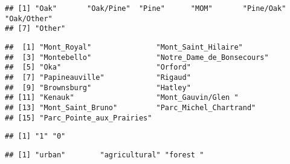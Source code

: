 \documentclass[
]{article}
\newenvironment{Shaded}{\begin{snugshade}}{\end{snugshade}}
\newcommand{\FunctionTok}[1]{\textcolor[rgb]{0.13,0.29,0.53}{\textbf{#1}}}
\newcommand{\NormalTok}[1]{#1}
\newcommand{\SpecialCharTok}[1]{\textcolor[rgb]{0.81,0.36,0.00}{\textbf{#1}}}
\begin{document}
\begin{verbatim}
## [1] "Oak"       "Oak/Pine"  "Pine"      "MOM"       "Pine/Oak"  "Oak/Other"
## [7] "Other"
\end{verbatim}

\begin{Shaded}
\end{Shaded}

\begin{verbatim}
##  [1] "Mont_Royal"               "Mont_Saint_Hilaire"      
##  [3] "Montebello"               "Notre_Dame_de_Bonsecours"
##  [5] "Oka"                      "Orford"                  
##  [7] "Papineauville"            "Rigaud"                  
##  [9] "Brownsburg"               "Hatley"                  
## [11] "Kenauk"                   "Mont_Gauvin/Glen "       
## [13] "Mont_Saint_Bruno"         "Parc_Michel_Chartrand"   
## [15] "Parc_Pointe_aux_Prairies"
\end{verbatim}

\begin{Shaded}
\end{Shaded}

\begin{verbatim}
## [1] "1" "0"
\end{verbatim}

\begin{Shaded}
\end{Shaded}

\begin{verbatim}
## [1] "urban"        "agricultural" "forest "
\end{verbatim}

\begin{Shaded}
\end{Shaded}
\end{document}
